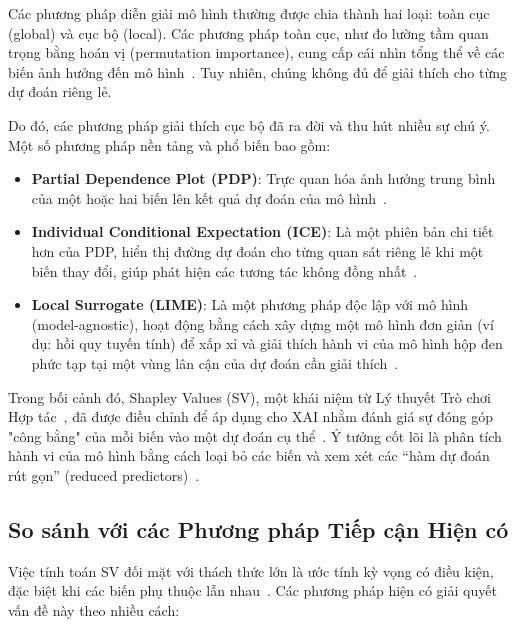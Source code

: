 \documentclass[12pt, a4paper]{article}
\begin{document}
Các phương pháp diễn giải mô hình thường được chia thành hai loại: toàn cục (global) và cục bộ (local). Các phương pháp toàn cục, như đo lường tầm quan trọng bằng hoán vị (permutation importance), cung cấp cái nhìn tổng thể về các biến ảnh hưởng đến mô hình~\citep{Breiman2001}. Tuy nhiên, chúng không đủ để giải thích cho từng dự đoán riêng lẻ.

Do đó, các phương pháp giải thích cục bộ đã ra đời và thu hút nhiều sự chú ý. Một số phương pháp nền tảng và phổ biến bao gồm:
\begin{itemize}
    \item \textbf{Partial Dependence Plot (PDP)}: Trực quan hóa ảnh hưởng trung bình của một hoặc hai biến lên kết quả dự đoán của mô hình~\citep{Friedman2001}. %
    \item \textbf{Individual Conditional Expectation (ICE)}: Là một phiên bản chi tiết hơn của PDP, hiển thị đường dự đoán cho từng quan sát riêng lẻ khi một biến thay đổi, giúp phát hiện các tương tác không đồng nhất~\citep{Goldstein2015}. %
    \item \textbf{Local Surrogate (LIME)}: Là một phương pháp độc lập với mô hình (model-agnostic), hoạt động bằng cách xây dựng một mô hình đơn giản (ví dụ: hồi quy tuyến tính) để xấp xỉ và giải thích hành vi của mô hình hộp đen phức tạp tại một vùng lân cận của dự đoán cần giải thích~\citep{Ribeiro2016}. %
\end{itemize}

Trong bối cảnh đó, Shapley Values (SV), một khái niệm từ Lý thuyết Trò chơi Hợp tác~\citep{Shapley1953}, đã được điều chỉnh để áp dụng cho XAI nhằm đánh giá sự đóng góp "công bằng" của mỗi biến vào một dự đoán cụ thể~\citep{Lundberg2017}. Ý tưởng cốt lõi là phân tích hành vi của mô hình bằng cách loại bỏ các biến và xem xét các ``hàm dự đoán rút gọn'' (reduced predictors)~\citep{Covert2020b}.

\subsection{So sánh với các Phương pháp Tiếp cận Hiện có}

Việc tính toán SV đối mặt với thách thức lớn là ước tính kỳ vọng có điều kiện, đặc biệt khi các biến phụ thuộc lẫn nhau~\citep{Aas2020}. Các phương pháp hiện có giải quyết vấn đề này theo nhiều cách:
\end{document}
